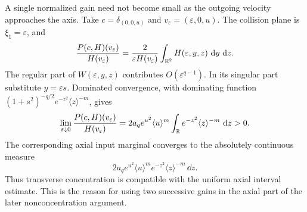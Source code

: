 \begin{remark}\label{ker:matching-axis}
A single normalized gain need not become small as the outgoing
velocity approaches the axis. Take $c=\delta_{(0,0,u)}$ and
$v_\varepsilon=(\varepsilon,0,u)$. The collision plane is
$\xi_1=\varepsilon$, and
\[
 \frac{P(c,H)(v_\varepsilon)}{H(v_\varepsilon)}
 =\frac{2}{\varepsilon H(v_\varepsilon)}
      \int_{\mathbb R^2}H(\varepsilon,y,z)\,\,\mathrm d y\,\,\mathrm d z.
\]
The regular part of $W(\varepsilon,y,z)$ contributes
$O(\varepsilon^{q-1})$. In its singular part substitute
$y=\varepsilon s$. Dominated convergence, with dominating function
$(1+s^2)^{-q/2}e^{-z^2}\langle z\rangle^{-m}$, gives
\[
 \lim_{\varepsilon\downarrow0}
 \frac{P(c,H)(v_\varepsilon)}{H(v_\varepsilon)}
 =2a_q e^{u^2}\langle u\rangle^m
        \int_{\mathbb R}e^{-z^2}\langle z\rangle^{-m}\,\,\mathrm d z>0.
\]
The corresponding axial input marginal converges to the absolutely
continuous measure
\[
2a_q e^{u^2}\langle u\rangle^m
 e^{-z^2}\langle z\rangle^{-m}\,\dd z.
\]
Thus transverse concentration is compatible with the uniform axial
interval estimate. This is the reason for using two successive gains
in the axial part of the later nonconcentration argument.
\end{remark}
